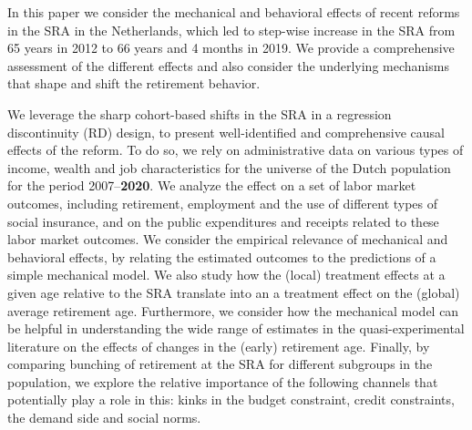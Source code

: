 \documentclass[12pt,a4paper]{article}
\begin{document}
In this paper we consider the mechanical and behavioral effects of recent reforms in the SRA in the Netherlands, which led to step-wise increase in the SRA from 65 years in 2012 to 66 years and 4 months in 2019. We provide a comprehensive assessment of the different effects and also consider the underlying mechanisms that shape and shift the retirement behavior.

We leverage the sharp cohort-based shifts in the SRA in a regression discontinuity (RD) design, to present well-identified and comprehensive causal effects of the reform. To do so, we rely on administrative data on various types of income, wealth and job characteristics for the universe of the Dutch population for the period 2007--\textbf{2020}. We analyze the effect on a set of labor market outcomes, including retirement, employment and the use of different types of social insurance, and on the public expenditures and receipts related to these labor market outcomes. We consider the empirical relevance of mechanical and behavioral effects, by relating the estimated outcomes to the predictions of a simple mechanical model. We also study how the (local) treatment effects at a given age relative to the SRA translate into an a treatment effect on the (global) average retirement age. Furthermore, we consider how the mechanical model can be helpful in understanding the wide range of estimates in the quasi-experimental literature on the effects of changes in the (early) retirement age. Finally, by comparing bunching of retirement at the SRA for different subgroups in the population, we explore the relative importance of the following channels that potentially play a role in this: kinks in the budget constraint, credit constraints, the demand side and social norms.

\end{document}
